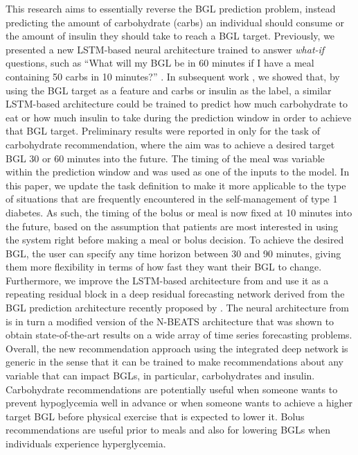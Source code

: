 \documentclass[journal,article,submit,moreauthors,pdftex]{Definitions/mdpi}
\begin{document}
This research aims to essentially reverse the BGL prediction problem, instead predicting the amount of carbohydrate (carbs) an individual should consume or the amount of insulin they should take to reach a BGL target.  Previously, we presented a new LSTM-based neural architecture trained to answer {\it what-if} questions, such as “What will my BGL be in 60 minutes if I have a meal containing 50 carbs in 10 minutes?” \cite{mirshekarian:embc19}.  In subsequent work \cite{beauchamp:kdh20}, we showed that, by using the BGL target as a feature and carbs or insulin as the label, a similar LSTM-based architecture could be trained to predict how much carbohydrate to eat or how much insulin to take during the prediction window in order to achieve that BGL target. Preliminary results were reported in \cite{beauchamp:kdh20} only for the task of carbohydrate recommendation, where the aim was to achieve a desired target BGL 30 or 60 minutes into the future. The timing of the meal was variable within the prediction window and was used as one of the inputs to the model. In this paper, we update the task definition to make it more applicable to the type of situations that are frequently encountered in the self-management of type 1 diabetes. As such, the timing of the bolus or meal is now fixed at 10 minutes into the future, based on the assumption that patients are most interested in using the system right before making a meal or bolus decision. To achieve the desired BGL, the user can specify any time horizon between 30 and 90 minutes, giving them more flexibility in terms of how fast they want their BGL to change. Furthermore, we improve the LSTM-based architecture from \cite{beauchamp:kdh20} and use it as a repeating residual block in a deep residual forecasting network derived from the BGL prediction architecture recently proposed by \citet{rubin_falcone:nbeats_bgl}. The neural architecture from \cite{rubin_falcone:nbeats_bgl} is in turn a modified version of the N-BEATS architecture \cite{oreshkin:nbeats} that was shown to obtain state-of-the-art results on a wide array of time series forecasting problems. Overall, the new recommendation approach using the integrated deep network is generic in the sense that it can be trained to make recommendations about any variable that can impact BGLs, in particular, carbohydrates and insulin. Carbohydrate recommendations are potentially useful when someone wants to prevent hypoglycemia well in advance or when someone wants to achieve a higher target BGL before physical exercise that is expected to lower it. Bolus recommendations are useful prior to meals and also for lowering BGLs when individuals experience hyperglycemia.
\end{document}
